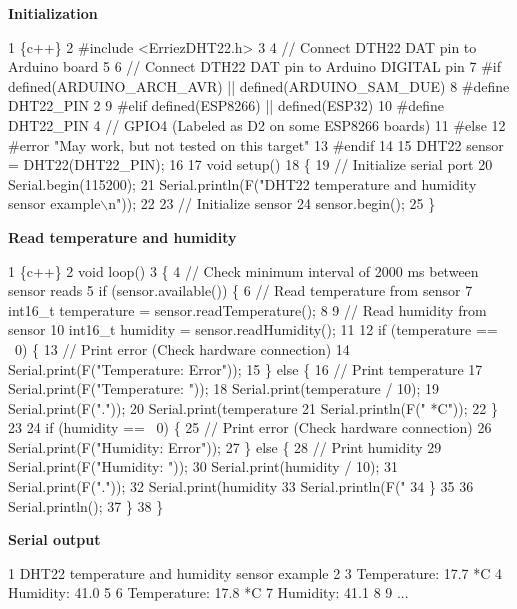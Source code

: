 {\bfseries Initialization}


\begin{DoxyCode}
1 \{c++\}
2 #include <ErriezDHT22.h>
3 
4 // Connect DTH22 DAT pin to Arduino board
5 
6 // Connect DTH22 DAT pin to Arduino DIGITAL pin
7 #if defined(ARDUINO\_ARCH\_AVR) || defined(ARDUINO\_SAM\_DUE)
8 #define DHT22\_PIN      2
9 #elif defined(ESP8266) || defined(ESP32)
10 #define DHT22\_PIN      4 // GPIO4 (Labeled as D2 on some ESP8266 boards)
11 #else
12 #error "May work, but not tested on this target"
13 #endif
14 
15 DHT22 sensor = DHT22(DHT22\_PIN);
16 
17 void setup()
18 \{
19     // Initialize serial port
20     Serial.begin(115200);
21     Serial.println(F("DHT22 temperature and humidity sensor example\(\backslash\)n"));
22 
23     // Initialize sensor
24     sensor.begin();
25 \}
\end{DoxyCode}


{\bfseries Read temperature and humidity}


\begin{DoxyCode}
1 \{c++\}
2 void loop()
3 \{
4     // Check minimum interval of 2000 ms between sensor reads
5     if (sensor.available()) \{
6         // Read temperature from sensor
7         int16\_t temperature = sensor.readTemperature();
8 
9         // Read humidity from sensor
10         int16\_t humidity = sensor.readHumidity();
11 
12         if (temperature == ~0) \{
13             // Print error (Check hardware connection)
14             Serial.print(F("Temperature: Error"));
15         \} else \{
16             // Print temperature
17             Serial.print(F("Temperature: "));
18             Serial.print(temperature / 10);
19             Serial.print(F("."));
20             Serial.print(temperature %
21             Serial.println(F(" *C"));
22         \}
23 
24         if (humidity == ~0) \{
25             // Print error (Check hardware connection)
26             Serial.print(F("Humidity: Error"));
27         \} else \{
28             // Print humidity
29             Serial.print(F("Humidity: "));
30             Serial.print(humidity / 10);
31             Serial.print(F("."));
32             Serial.print(humidity %
33             Serial.println(F(" %
34         \}
35 
36         Serial.println();
37       \}
38 \}
\end{DoxyCode}


{\bfseries Serial output}


\begin{DoxyCode}
1 DHT22 temperature and humidity sensor example
2 
3 Temperature: 17.7 *C
4 Humidity: 41.0 %
5 
6 Temperature: 17.8 *C
7 Humidity: 41.1 %
8 
9 ...
\end{DoxyCode}



